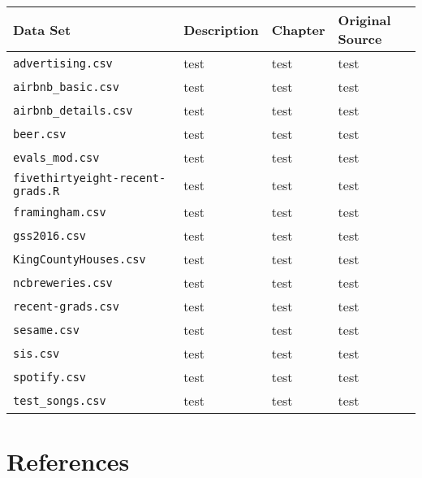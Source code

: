 \documentclass[]{book}
\begin{document}
\begin{longtable}[]{@{}llll@{}}
\toprule
Data Set & Description & Chapter & Original Source\tabularnewline
\midrule
\endhead
\texttt{advertising.csv} & test & test & test\tabularnewline
\texttt{airbnb\_basic.csv} & test & test & test\tabularnewline
\texttt{airbnb\_details.csv} & test & test & test\tabularnewline
\texttt{beer.csv} & test & test & test\tabularnewline
\texttt{evals\_mod.csv} & test & test & test\tabularnewline
\texttt{fivethirtyeight-recent-grads.R} & test & test &
test\tabularnewline
\texttt{framingham.csv} & test & test & test\tabularnewline
\texttt{gss2016.csv} & test & test & test\tabularnewline
\texttt{KingCountyHouses.csv} & test & test & test\tabularnewline
\texttt{ncbreweries.csv} & test & test & test\tabularnewline
\texttt{recent-grads.csv} & test & test & test\tabularnewline
\texttt{sesame.csv} & test & test & test\tabularnewline
\texttt{sis.csv} & test & test & test\tabularnewline
\texttt{spotify.csv} & test & test & test\tabularnewline
\texttt{test\_songs.csv} & test & test & test\tabularnewline
\bottomrule
\end{longtable}

\chapter{References}\label{refs}


\end{document}
